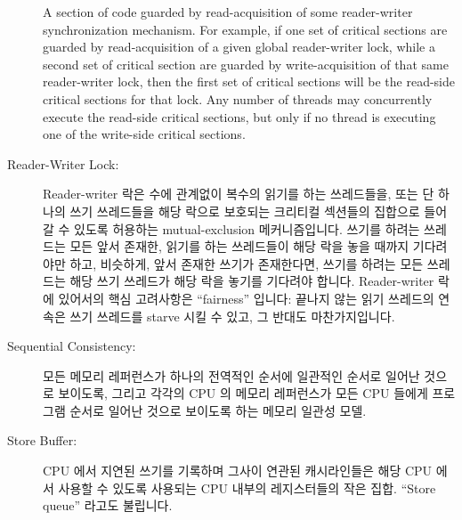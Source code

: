 \begin{description}
	A section of code guarded by read-acquisition of
	some reader-writer synchronization mechanism.
	For example, if one set of critical sections are guarded by
	read-acquisition of
	a given global reader-writer lock, while a second set of critical
	section are guarded by write-acquisition of that same reader-writer
	lock, then the first set of critical sections will be the
	read-side critical sections for that lock.
	Any number of threads may concurrently execute the read-side
	critical sections, but only if no thread is executing one of
	the write-side critical sections.
	\fi
\item[Reader-Writer Lock:]
	Reader-writer 락은 수에 관계없이 복수의 읽기를 하는 쓰레드들을, 또는 단
	하나의 쓰기 쓰레드들을 해당 락으로 보호되는 크리티컬 섹션들의 집합으로
	들어갈 수 있도록 허용하는 mutual-exclusion 메커니즘입니다.
	쓰기를 하려는 쓰레드는 모든 앞서 존재한, 읽기를 하는 쓰레드들이 해당
	락을 놓을 때까지 기다려야만 하고, 비슷하게, 앞서 존재한 쓰기가
	존재한다면, 쓰기를 하려는 모든 쓰레드는 해당 쓰기 쓰레드가 해당 락을
	놓기를 기다려야 합니다.
	Reader-writer 락에 있어서의 핵심 고려사항은 ``fairness'' 입니다:
	끝나지 않는 읽기 쓰레드의 연속은 쓰기 쓰레드를 starve 시킬 수 있고, 그
	반대도 마찬가지입니다.
	\iffalse

	A reader-writer lock is a mutual-exclusion mechanism that
	permits any number of reading
	threads, or but one writing thread, into the set of critical
	sections guarded by that lock.
	Threads attempting to write must wait until all pre-existing
	reading threads release the lock, and, similarly, if there
	is a pre-existing writer, any threads attempting to write must
	wait for the writer to release the lock.
	A key concern for reader-writer locks is ``fairness'':
	can an unending stream of readers starve a writer or vice versa.
	\fi
\item[Sequential Consistency:]
	모든 메모리 레퍼런스가 하나의 전역적인 순서에 일관적인 순서로 일어난
	것으로 보이도록, 그리고 각각의 CPU 의 메모리 레퍼런스가 모든 CPU 들에게
	프로그램 순서로 일어난 것으로 보이도록 하는 메모리 일관성 모델.
	\iffalse

	A memory-consistency model where all memory references appear to occur
	in an order consistent with
	a single global order, and where each CPU's memory references
	appear to all CPUs to occur in program order.
	\fi
\item[Store Buffer:]
	CPU 에서 지연된 쓰기를 기록하며 그사이 연관된 캐시라인들은 해당 CPU
	에서 사용할 수 있도록 사용되는 CPU 내부의 레지스터들의 작은 집합.
	``Store queue'' 라고도 불립니다.
	\iffalse


\end{description}
